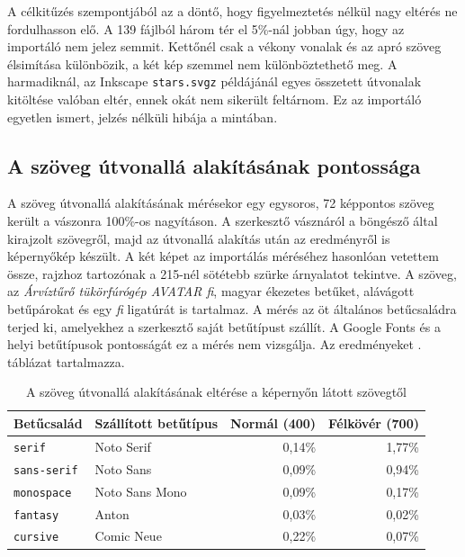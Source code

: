 A célkitűzés szempontjából az a döntő, hogy figyelmeztetés nélkül nagy eltérés ne fordulhasson elő. A 139 fájlból három tér el 5\%-nál jobban úgy, hogy az importáló nem jelez semmit. Kettőnél csak a vékony vonalak és az apró szöveg élsimítása különbözik, a két kép szemmel nem különböztethető meg. A harmadiknál, az Inkscape \texttt{stars.svgz} példájánál egyes összetett útvonalak kitöltése valóban eltér, ennek okát nem sikerült feltárnom. Ez az importáló egyetlen ismert, jelzés nélküli hibája a mintában.

\subsection{A szöveg útvonallá alakításának pontossága}
\label{sec:text_accuracy}

A szöveg útvonallá alakításának mérésekor egy egysoros, 72 képpontos szöveg került a vászonra 100\%-os nagyításon. A szerkesztő vásznáról a böngésző által kirajzolt szövegről, majd az útvonallá alakítás után az eredményről is képernyőkép készült. A két képet az importálás méréséhez hasonlóan vetettem össze, rajzhoz tartozónak a 215-nél sötétebb szürke árnyalatot tekintve. A szöveg, az \textit{Árvíztűrő tükörfúrógép AVATAR fi}, magyar ékezetes betűket, alávágott betűpárokat és egy \textit{fi} ligatúrát is tartalmaz. A mérés az öt általános betűcsaládra terjed ki, amelyekhez a szerkesztő saját betűtípust szállít. A Google Fonts és a helyi betűtípusok pontosságát ez a mérés nem vizsgálja. Az eredményeket . táblázat tartalmazza.

\begin{table}[!ht]
\caption{A szöveg útvonallá alakításának eltérése a képernyőn látott szövegtől}
\label{tab:text-accuracy}
\centering
\footnotesize
\begin{tabular}{|l|l|r|r|}
\hline
\textbf{Betűcsalád} & \textbf{Szállított betűtípus} & \textbf{Normál (400)} & \textbf{Félkövér (700)} \\ \hline
\texttt{serif} & Noto Serif & 0,14\% & 1,77\% \\ \hline
\texttt{sans-serif} & Noto Sans & 0,09\% & 0,94\% \\ \hline
\texttt{monospace} & Noto Sans Mono & 0,09\% & 0,17\% \\ \hline
\texttt{fantasy} & Anton & 0,03\% & 0,02\% \\ \hline
\texttt{cursive} & Comic Neue & 0,22\% & 0,07\% \\ \hline
\end{tabular}
\end{table}

